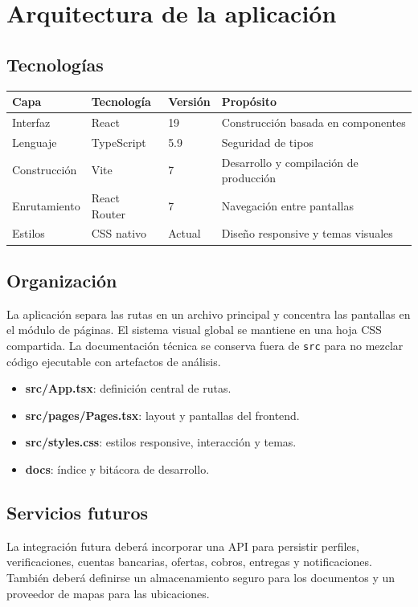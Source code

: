 \section{Arquitectura de la aplicación}

\subsection{Tecnologías}

\begin{longtable}{p{} p{} p{} p{}}
\toprule
\textbf{Capa} & \textbf{Tecnología} & \textbf{Versión} & \textbf{Propósito} \\
\midrule
Interfaz & React & 19 & Construcción basada en componentes \\
Lenguaje & TypeScript & 5.9 & Seguridad de tipos \\
Construcción & Vite & 7 & Desarrollo y compilación de producción \\
Enrutamiento & React Router & 7 & Navegación entre pantallas \\
Estilos & CSS nativo & Actual & Diseño responsive y temas visuales \\
\bottomrule
\end{longtable}

\subsection{Organización}

La aplicación separa las rutas en un archivo principal y concentra las pantallas en el módulo de páginas. El sistema visual global se mantiene en una hoja CSS compartida. La documentación técnica se conserva fuera de \texttt{src} para no mezclar código ejecutable con artefactos de análisis.

\begin{itemize}[leftmargin=*]
  \item \textbf{src/App.tsx}: definición central de rutas.
  \item \textbf{src/pages/Pages.tsx}: layout y pantallas del frontend.
  \item \textbf{src/styles.css}: estilos responsive, interacción y temas.
  \item \textbf{docs}: índice y bitácora de desarrollo.
\end{itemize}

\subsection{Servicios futuros}

La integración futura deberá incorporar una API para persistir perfiles, verificaciones, cuentas bancarias, ofertas, cobros, entregas y notificaciones. También deberá definirse un almacenamiento seguro para los documentos y un proveedor de mapas para las ubicaciones.
